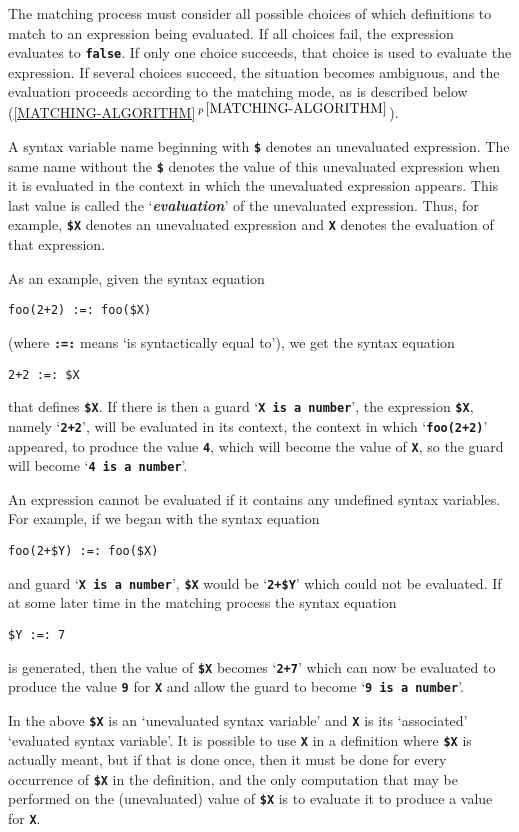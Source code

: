 \documentclass[12pt]{article}
\makeatletter
\newcommand{\TT}[1]{{\tt \bfseries #1}}
\newcommand{\key}[1]{{\bf \em #1}\index{#1}}
\newcommand{\ttmkey}[2]{\TT{#1}\index{#1@{\tt #1}!#2}}
\newcommand{\secref}[1]{\ref{#1}$\,^{p\,\pageref{#1}}$}
\makeatother
\begin{document}
The matching process must consider all possible choices of which definitions
to match to an expression being evaluated.  If all choices fail, the
expression evaluates to \TT{false}.  If only one choice succeeds, that
choice is used to evaluate the expression.  If several choices succeed,
the situation becomes ambiguous, and the evaluation proceeds according
to the matching mode, as is described below
(\secref{MATCHING-ALGORITHM}).

A syntax variable name beginning with
\ttmkey{\$}{in syntax variable name} denotes an unevaluated
expression.  The same name without the \TT{\$} denotes the value
of this unevaluated expression when it is evaluated
in the context in which the unevaluated expression appears.
This last value is called the `\key{evaluation}' of the unevaluated
expression.  Thus, for example, \TT{\$X} denotes an unevaluated
expression and \TT{X} denotes the evaluation of that expression.

As an example, given the syntax equation
\begin{center}
\verb|foo(2+2) :=: foo($X)|
\end{center}
(where \TT{:=:} means `is syntactically equal to'), we get
the syntax equation
\begin{center}
\verb|2+2 :=: $X|
\end{center}
that defines \TT{\$X}.  If there is then a guard `\TT{X is a number}',
the expression \TT{\$X}, namely `\TT{2+2}',
will be evaluated in its context, the context in which `\TT{foo(2+2)}'
appeared, to produce the value \TT{4}, which will become the value of
\TT{X}, so the guard will become `\TT{4 is a number}'.

An expression cannot be evaluated if it contains any undefined syntax
variables.  For example, if we began with the syntax equation
\begin{center}
\verb|foo(2+$Y) :=: foo($X)|
\end{center}
and guard `\TT{X is a number}', \TT{\$X} would be `\TT{2+\$Y}' which
could not be evaluated.  If at some later time in the matching process
the syntax equation
\begin{center}
\verb|$Y :=: 7|
\end{center}
is generated, then the value of \TT{\$X} becomes `\TT{2+7}'
which can now be evaluated to produce the value \TT{9} for \TT{X}
and allow the guard to become `\TT{9 is a number}'.

In the above \TT{\$X} is an `unevaluated syntax variable' and
\TT{X} is its `associated' `evaluated syntax variable'.  It is
possible to use \TT{X} in a definition where \TT{\$X} is actually
meant, but if that is done once, then it must be done for every occurrence
of \TT{\$X} in the definition, and the only computation that may be
performed on the (unevaluated) value of \TT{\$X} is to evaluate it to
produce a value for \TT{X}.
\end{document}
